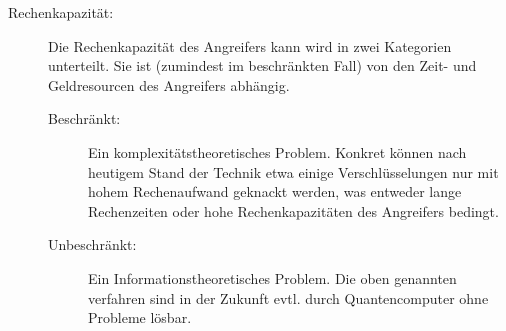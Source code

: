 \documentclass[ngerman]{fbi-aufgabenblatt}
\begin{document}
\begin{description}
	\item[Rechenkapazität:] Die Rechenkapazität des Angreifers kann wird in zwei Kategorien unterteilt. Sie ist (zumindest im beschränkten Fall) von den Zeit- und Geldresourcen des Angreifers abhängig.
	\begin{description}
		\item[Beschränkt:] Ein komplexitätstheoretisches Problem. Konkret können nach heutigem Stand der Technik etwa einige Verschlüsselungen nur mit hohem Rechenaufwand geknackt werden, was entweder lange Rechenzeiten oder hohe Rechenkapazitäten des Angreifers bedingt.
		\item[Unbeschränkt:] Ein Informationstheoretisches Problem. Die oben genannten verfahren sind in der Zukunft evtl. durch Quantencomputer ohne Probleme lösbar. 
	\end{description}
\end{description}

%
\end{document}
